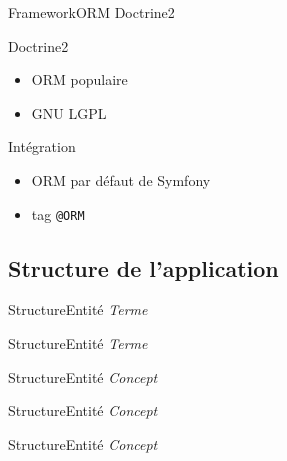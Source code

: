 \begin{frame}{Framework}{ORM Doctrine2}
\begin{block}{Doctrine2}
\begin{itemize}
\item ORM populaire
\item GNU LGPL
\end{itemize}
\end{block}

\begin{block}{Intégration}
\begin{itemize}
\item ORM par défaut de Symfony
\item tag \texttt{@ORM}
\end{itemize}
\end{block}
\end{frame}

\subsection{Structure de l'application}
\begin{frame}{Structure}{Entité \emph{Terme}}

\end{frame}

\begin{frame}{Structure}{Entité \emph{Terme}}

\end{frame}

\begin{frame}{Structure}{Entité \emph{Concept}}

\end{frame}

\begin{frame}{Structure}{Entité \emph{Concept}}

\end{frame}

\begin{frame}{Structure}{Entité \emph{Concept}}

\end{frame}

